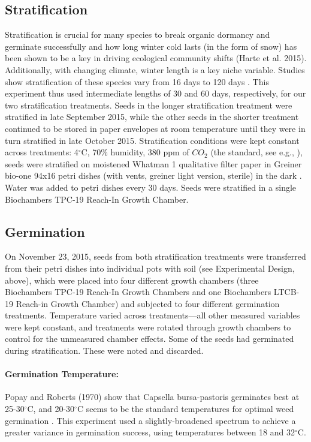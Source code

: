 \documentclass[12pt]{article}\usepackage[]{graphicx}\usepackage[]{color}
\begin{document}
	\subsection{Stratification}
	Stratification is crucial for many species to break organic dormancy and germinate successfully \parencite{Baskin1998,Popay1970,Wulff1994} and how long winter cold lasts (in the form of snow) has been shown to be a key in driving ecological community shifts (Harte et al. 2015). Additionally, with changing climate, winter length is a key niche variable. Studies show stratification of these species vary from 16 days \parencite{Popay1970} to 120 days \parencite{Meekins1999}. This experiment thus used intermediate lengths of 30 and 60 days, respectively, for our two stratification treatments. Seeds in the longer stratification treatment were stratified in late September 2015, while the other seeds in the shorter treatment continued to be stored in paper envelopes at room temperature until they were in turn stratified in late October 2015. Stratification conditions were kept constant across treatments:  4$^\circ$C, 70\% humidity, 380 ppm of $CO_2$ (the standard, see e.g., \textcite{Meekins1999,Popay1970}), seeds were stratified on moistened Whatman 1 qualitative filter paper in Greiner bio-one 94x16 petri dishes (with vents, greiner light version, sterile) in the dark \parencite{Baskin1998,Popay1970}.  Water was added to petri dishes every 30 days. Seeds were stratified in a single Biochambers TPC-19 Reach-In Growth Chamber. 
	
	\subsection{Germination }
	On November 23, 2015, seeds from both stratification treatments were transferred from their petri dishes into individual pots with soil (see Experimental Design, above), which were placed into four different growth chambers (three Biochambers TPC-19 Reach-In Growth Chambers and one Biochambers LTCB-19 Reach-in Growth Chamber) and subjected to four different germination treatments. Temperature varied across treatments---all other measured variables were kept constant, and treatments were rotated through growth chambers to control for the unmeasured chamber effects. Some of the seeds had germinated during stratification. These were noted and discarded.
	
	\paragraph{Germination Temperature:} Popay and Roberts (1970) show that Capsella bursa-pastoris germinates best at 25-30$^\circ$C, and 20-30$^\circ$C seems to be the standard temperatures for optimal weed germination \parencite{Hartmann2010,Steinbauer1957,Wulff1994}. This experiment used a slightly-broadened spectrum to achieve a greater variance in germination success, using temperatures between 18 and 32$^\circ$C. 
	
\end{document}
